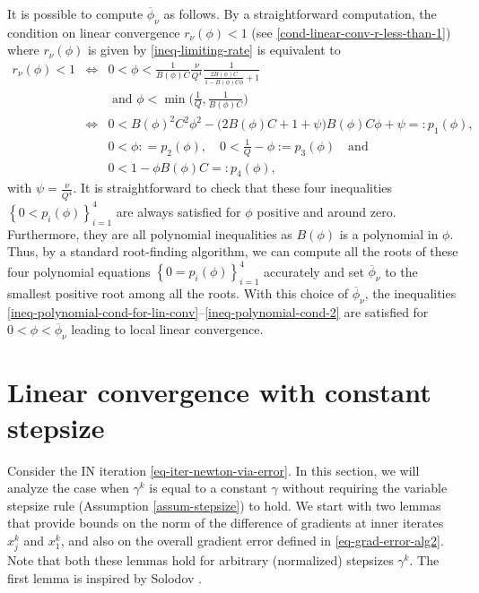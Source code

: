\documentclass[final,numbook]{svjour3}
\begin{document}
\begin{remark}\label{rema-upper-bound-phi-bar}
It is possible to compute $\overline{\phi}_\nu$ as follows. By a straightforward computation, the condition on linear convergence $r_\nu(\phi) < 1$ (see \eqref{cond-linear-conv-r-less-than-1}) where $r_\nu(\phi)$ is given by \eqref{ineq-limiting-rate} is equivalent to 
\begin{eqnarray}
r_\nu(\phi) < 1 &\iff& 0 < \phi < \frac{1}{B(\phi)C}\frac{\nu}{Q^4} \frac{1}{ \frac{2B(\phi)C}{1-B(\phi)C\phi} + 1} \label{ineq-polynomial-cond-for-lin-conv}\\
&&\mbox{  and  } \phi < \min\bigg(\frac{1}{Q}, \frac{1}{B(\phi)C}\bigg)\label{ineq-polynomial-cond-2}  \\
 &\iff& 0 < B(\phi)^2 C^2 \phi^2 - \big(2B(\phi)C+1+\psi\big)B(\phi)C\phi + \psi=:p_1(\phi), \nonumber \\
    &&\mbox{} 0 < \phi: = p_2(\phi), \quad  0 < \frac{1}{Q} - \phi:=p_3(\phi) \quad \mbox{and} \nonumber \\ 
        &&\mbox{} 0 < 1 - \phi B(\phi) C =: p_4(\phi), \nonumber 
\end{eqnarray}
with $\psi = \frac{\nu}{Q^4}$. It is straightforward to check that these four inequalities $\left\{0<p_i(\phi)\right\}_{i=1}^4$ are always satisfied for $\phi$ positive and around zero. Furthermore, they are all polynomial inequalities as $B(\phi)$ is a polynomial in $\phi$. Thus, by a standard root-finding algorithm, we can compute all the roots of these four polynomial equations $\left\{0=p_i(\phi)\right\}_{i=1}^4$ accurately and set $\overline{\phi}_\nu$ to the smallest positive root among all the roots. With this choice of $\overline{\phi}_\nu$, the inequalities \eqref{ineq-polynomial-cond-for-lin-conv}--\eqref{ineq-polynomial-cond-2} are satisfied for $0<\phi<\overline{\phi}_\nu$ leading to local linear convergence.
\end{remark}

 

\section{Linear convergence with constant stepsize}
\label{sec-lin-conv-constant-step}
Consider the IN iteration \eqref{eq-iter-newton-via-error}. In this section, we will analyze the case when $\gamma^k$ is equal to a constant $\gamma$ without requiring the variable stepsize rule (Assumption \ref{assum-stepsize}) to hold. We start with two lemmas that provide bounds on the norm of the difference of gradients at inner iterates 
$x_j^k$ and $x_1^k$, and also on the overall gradient error defined in \eqref{eq-grad-error-alg2}. Note that both these lemmas hold for arbitrary (normalized) stepsizes $\gamma^k$. The first lemma is inspired by Solodov \cite{Solodov98IncrGrad}. 
\end{document}
